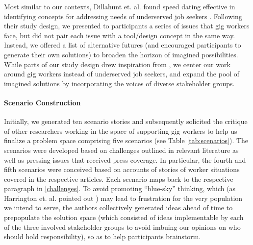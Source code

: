 Most similar to our contexts, Dillahunt et. al. found speed dating effective in identifying concepts for addressing needs of underserved job seekers \cite{dillahunt2018designing}. 
Following their study design, we presented to participants a series of issues that gig workers face, but did not pair each issue with a tool/design concept in the same way. 
Instead, we offered a list of alternative futures (and encouraged participants to generate their own solutions) to broaden the horizon of imagined possibilities. 
While parts of our study design drew inspiration from \cite{dillahunt2018designing}, we center our work around gig workers instead of underserved job seekers, and expand the pool of imagined solutions by incorporating the voices of diverse stakeholder groups. 

\paragraph{Scenario Construction}
Initially, we generated ten scenario stories and subsequently solicited the critique of other researchers working in the space of supporting gig workers to help us finalize a problem space comprising five scenarios (see Table \ref{tab:scenarios}).
The scenarios were developed based on challenges outlined in relevant literature as well as pressing issues that received press coverage. In particular, the fourth \cite{Al_Jazeera2022-vz} and fifth \cite{noauthor_undated-xr} scenarios were conceived based on accounts of stories of worker situations covered in the respective articles. Each scenario maps back to the respective paragraph in 
\ref{challenges}.
To avoid promoting ``blue-sky'' thinking, which (as Harrington et. al. pointed out \cite{harrington2019deconstructing}) may lead to frustration for the very population we intend to serve, the authors collectively generated ideas ahead of time to prepopulate the solution space (which consisted of ideas implementable by each of the three involved stakeholder groups to avoid imbuing our opinions on who should hold responsibility), so as to help participants brainstorm.

